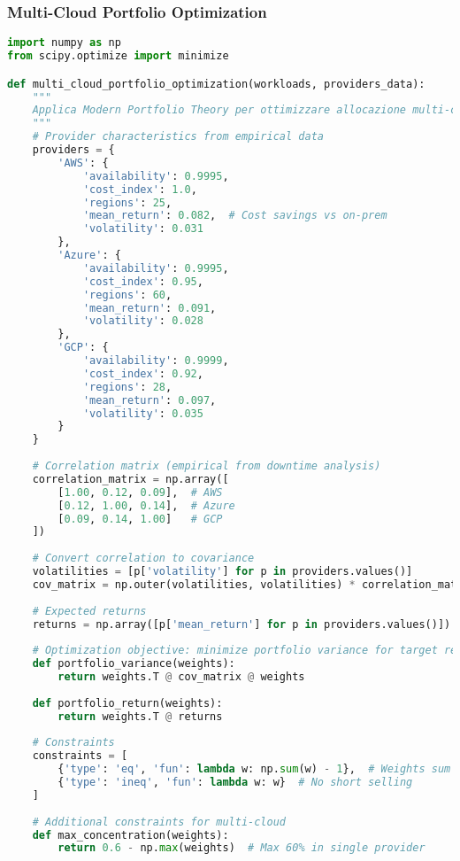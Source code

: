 \subsubsection{Multi-Cloud Portfolio Optimization}

\begin{lstlisting}[language=Python, caption=Ottimizzazione Portfolio Multi-Cloud con MPT]
import numpy as np
from scipy.optimize import minimize

def multi_cloud_portfolio_optimization(workloads, providers_data):
    """
    Applica Modern Portfolio Theory per ottimizzare allocazione multi-cloud
    """
    # Provider characteristics from empirical data
    providers = {
        'AWS': {
            'availability': 0.9995,
            'cost_index': 1.0,
            'regions': 25,
            'mean_return': 0.082,  # Cost savings vs on-prem
            'volatility': 0.031
        },
        'Azure': {
            'availability': 0.9995,
            'cost_index': 0.95,
            'regions': 60,
            'mean_return': 0.091,
            'volatility': 0.028
        },
        'GCP': {
            'availability': 0.9999,
            'cost_index': 0.92,
            'regions': 28,
            'mean_return': 0.097,
            'volatility': 0.035
        }
    }
    
    # Correlation matrix (empirical from downtime analysis)
    correlation_matrix = np.array([
        [1.00, 0.12, 0.09],  # AWS
        [0.12, 1.00, 0.14],  # Azure
        [0.09, 0.14, 1.00]   # GCP
    ])
    
    # Convert correlation to covariance
    volatilities = [p['volatility'] for p in providers.values()]
    cov_matrix = np.outer(volatilities, volatilities) * correlation_matrix
    
    # Expected returns
    returns = np.array([p['mean_return'] for p in providers.values()])
    
    # Optimization objective: minimize portfolio variance for target return
    def portfolio_variance(weights):
        return weights.T @ cov_matrix @ weights
    
    def portfolio_return(weights):
        return weights.T @ returns
    
    # Constraints
    constraints = [
        {'type': 'eq', 'fun': lambda w: np.sum(w) - 1},  # Weights sum to 1
        {'type': 'ineq', 'fun': lambda w: w}  # No short selling
    ]
    
    # Additional constraints for multi-cloud
    def max_concentration(weights):
        return 0.6 - np.max(weights)  # Max 60% in single provider
    

\end{lstlisting}
